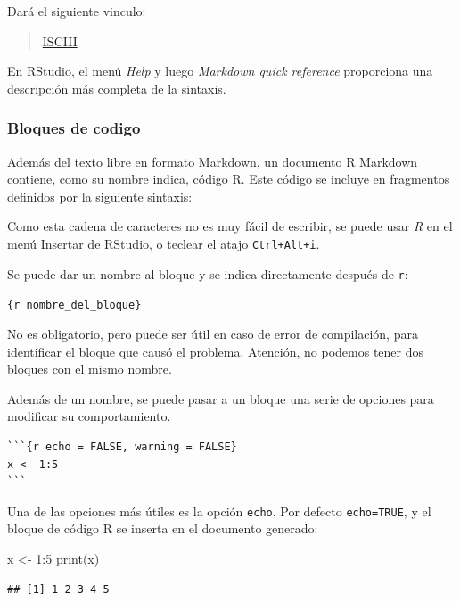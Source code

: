 \documentclass[
]{article}
\newenvironment{Shaded}{\begin{snugshade}}{\end{snugshade}}
\newcommand{\DecValTok}[1]{\textcolor[rgb]{0.00,0.00,0.81}{#1}}
\newcommand{\FunctionTok}[1]{\textcolor[rgb]{0.00,0.00,0.00}{#1}}
\newcommand{\NormalTok}[1]{#1}
\newcommand{\OtherTok}[1]{\textcolor[rgb]{0.56,0.35,0.01}{#1}}
\newcommand{\SpecialCharTok}[1]{\textcolor[rgb]{0.00,0.00,0.00}{#1}}
\numberwithin{ejcnt}{section}
\begin{document}
Dará el siguiente vinculo:

\begin{quote}
\href{http://www.isciii.es/}{ISCIII}
\end{quote}

En RStudio, el menú \emph{Help} y luego \emph{Markdown quick reference} proporciona una descripción más completa de la sintaxis.

\hypertarget{bloques-de-codigo}{%
\subsubsection{Bloques de codigo}\label{bloques-de-codigo}}

Además del texto libre en formato Markdown, un documento R Markdown contiene, como su nombre indica, código R. Este código se incluye en fragmentos definidos por la siguiente sintaxis:

Como esta cadena de caracteres no es muy fácil de escribir, se puede usar \emph{R} en el menú Insertar de RStudio, o teclear el atajo \texttt{Ctrl+Alt+i}.

Se puede dar un nombre al bloque y se indica directamente después de \texttt{r}:

\texttt{\{r\ nombre\_del\_bloque\}}

No es obligatorio, pero puede ser útil en caso de error de compilación, para identificar el bloque que causó el problema. Atención, no podemos tener dos bloques con el mismo nombre.

Además de un nombre, se puede pasar a un bloque una serie de opciones para modificar su comportamiento.

\begin{verbatim}
```{r echo = FALSE, warning = FALSE}
x <- 1:5
```
\end{verbatim}

Una de las opciones más útiles es la opción \texttt{echo}. Por defecto \texttt{echo=TRUE}, y el bloque de código R se inserta en el documento generado:

\begin{Shaded}
\begin{Highlighting}[]
\NormalTok{x }\OtherTok{\textless{}{-}} \DecValTok{1}\SpecialCharTok{:}\DecValTok{5}
\FunctionTok{print}\NormalTok{(x)}
\end{Highlighting}
\end{Shaded}

\begin{verbatim}
## [1] 1 2 3 4 5
\end{verbatim}
\end{document}

